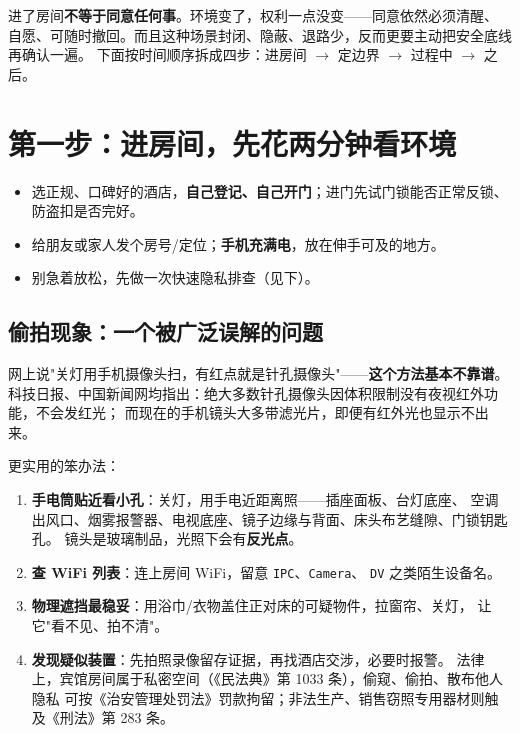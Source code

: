 \documentclass[12pt,UTF8,openany]{ctexbook}
\begin{document}
进了房间\textbf{不等于同意任何事}。环境变了，权利一点没变——同意依然必须清醒、
自愿、可随时撤回。而且这种场景封闭、隐蔽、退路少，反而更要主动把安全底线再确认一遍。
下面按时间顺序拆成四步：进房间 $\to$ 定边界 $\to$ 过程中 $\to$ 之后。

\section{第一步：进房间，先花两分钟看环境}

\begin{itemize}[leftmargin=2em]
  \item 选正规、口碑好的酒店，\textbf{自己登记、自己开门}；进门先试门锁能否正常反锁、
        防盗扣是否完好。
  \item 给朋友或家人发个房号/定位；\textbf{手机充满电}，放在伸手可及的地方。
  \item 别急着放松，先做一次快速隐私排查（见下）。
\end{itemize}

\subsection*{偷拍现象：一个被广泛误解的问题}

网上说"关灯用手机摄像头扫，有红点就是针孔摄像头"——\textbf{这个方法基本不靠谱}。
科技日报、中国新闻网均指出：绝大多数针孔摄像头因体积限制没有夜视红外功能，不会发红光；
而现在的手机镜头大多带滤光片，即便有红外光也显示不出来。

更实用的笨办法：

\begin{enumerate}[leftmargin=2em,itemsep=0.3em]
  \item \textbf{手电筒贴近看小孔}：关灯，用手电近距离照——插座面板、台灯底座、
        空调出风口、烟雾报警器、电视底座、镜子边缘与背面、床头布艺缝隙、门锁钥匙孔。
        镜头是玻璃制品，光照下会有\textbf{反光点}。
  \item \textbf{查 WiFi 列表}：连上房间 WiFi，留意 \texttt{IPC}、\texttt{Camera}、
        \texttt{DV} 之类陌生设备名。
  \item \textbf{物理遮挡最稳妥}：用浴巾/衣物盖住正对床的可疑物件，拉窗帘、关灯，
        让它"看不见、拍不清"。
  \item \textbf{发现疑似装置}：先拍照录像留存证据，再找酒店交涉，必要时报警。
        法律上，宾馆房间属于私密空间（《民法典》第 1033 条），偷窥、偷拍、散布他人隐私
        可按《治安管理处罚法》罚款拘留；非法生产、销售窃照专用器材则触及《刑法》第 283 条。
\end{enumerate}
\end{document}
